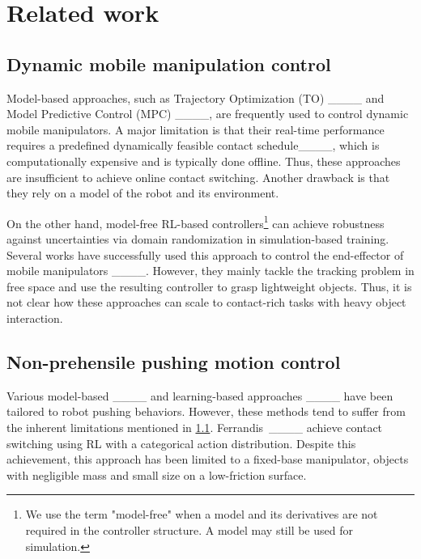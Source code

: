 \section{Related work}
\label{sec:related_work}
%
\subsection{Dynamic mobile manipulation control}
\label{sec:mobile_manipulation}
%
Model-based approaches, such as Trajectory Optimization (TO) ____ and Model Predictive Control (MPC) ____, are frequently used to control dynamic mobile manipulators. A major limitation is that their real-time performance requires a predefined dynamically feasible contact schedule____, which is computationally expensive and is typically done offline. Thus, these approaches are insufficient to achieve online contact switching. Another drawback is that they rely on a model of the robot and its environment.

On the other hand, model-free RL-based controllers\footnote{We use the term "model-free" when a model and its derivatives are not required in the controller structure. A model may still be used for simulation.} can achieve robustness against uncertainties via domain randomization in simulation-based training. Several works have successfully used this approach to control the end-effector of mobile manipulators ____. However, they mainly tackle the tracking problem in free space and use the resulting controller to grasp lightweight objects. Thus, it is not clear how these approaches can scale to contact-rich tasks with heavy object interaction.
%
\subsection{Non-prehensile pushing motion control}
\label{sec:nonprehensile_manipulation}

Various model-based ____ and learning-based approaches ____ have been tailored to robot pushing behaviors. However, these methods tend to suffer from the inherent limitations mentioned in \cref{sec:mobile_manipulation}. Ferrandis~\etal____ achieve contact switching using RL with a categorical action distribution. Despite this achievement, this approach has been limited to a fixed-base manipulator, objects with negligible mass and small size on a low-friction surface.

